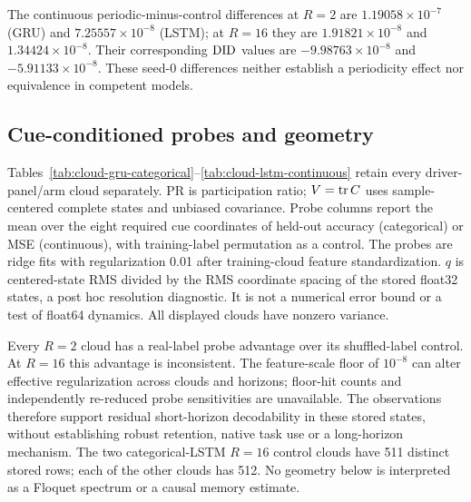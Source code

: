 The continuous periodic-minus-control differences at $R=2$ are
$1.19058\times10^{-7}$ (GRU) and $7.25557\times10^{-8}$ (LSTM);
at $R=16$ they are $1.91821\times10^{-8}$ and $1.34424\times10^{-8}$.
Their corresponding $\mathrm{DID}$ values are $-9.98763\times10^{-8}$ and
$-5.91133\times10^{-8}$. These seed-0 differences neither establish a
periodicity effect nor equivalence in competent models.

\subsection{Cue-conditioned probes and geometry}
Tables~\ref{tab:cloud-gru-categorical}--\ref{tab:cloud-lstm-continuous} retain every
driver-panel/arm cloud separately. PR is participation ratio; $V=\operatorname{tr} C$ uses
sample-centered complete states and unbiased covariance. Probe columns report
the mean over the eight required cue coordinates of held-out accuracy (categorical)
or MSE (continuous), with training-label permutation as a control. The probes are
ridge fits with regularization 0.01 after training-cloud feature standardization.
$q$ is centered-state RMS divided by the RMS coordinate spacing of the stored
float32 states, a post hoc resolution diagnostic. It is not a numerical error bound
or a test of float64 dynamics. All displayed clouds have nonzero variance.

Every $R=2$ cloud has a real-label probe advantage over its shuffled-label
control. At $R=16$ this advantage is inconsistent. The feature-scale floor
of $10^{-8}$ can alter effective regularization across clouds and horizons;
floor-hit counts and independently re-reduced probe sensitivities are unavailable.
The observations therefore support residual short-horizon decodability in these
stored states, without establishing robust retention, native task use or a
long-horizon mechanism. The two categorical-LSTM $R=16$ control clouds have
511 distinct stored rows; each of the other clouds has 512. No geometry below
is interpreted as a Floquet spectrum or a causal memory estimate.


